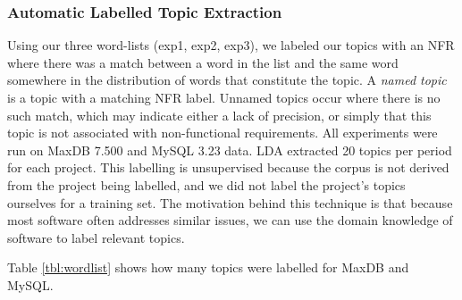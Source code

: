 \documentclass[]{sig-alternate}
\begin{document}
\subsubsection{Automatic Labelled Topic Extraction}


Using our three word-lists (\textsf{exp1}, \textsf{exp2}, \textsf{exp3}), we labeled our topics with an NFR where there was a match between a word in the list and the same word somewhere in the distribution of words that constitute the topic.
A \emph{named topic} is a topic with a matching NFR label. Unnamed
topics occur where there is no such match, which may indicate either a lack of precision, or simply that this topic is not associated with non-functional requirements.
All experiments were run on MaxDB 7.500 and MySQL 3.23 data. LDA
extracted 20 topics per period for each project.
This labelling is unsupervised because the corpus is not derived from 
the project being labelled, and we did not label the project's topics
ourselves for a training set. The motivation behind this technique is that
because most software often addresses similar issues, we can use the
domain knowledge of software to label relevant topics.

Table \ref{tbl:wordlist} shows how many topics were labelled for MaxDB
and MySQL.
\end{document}
